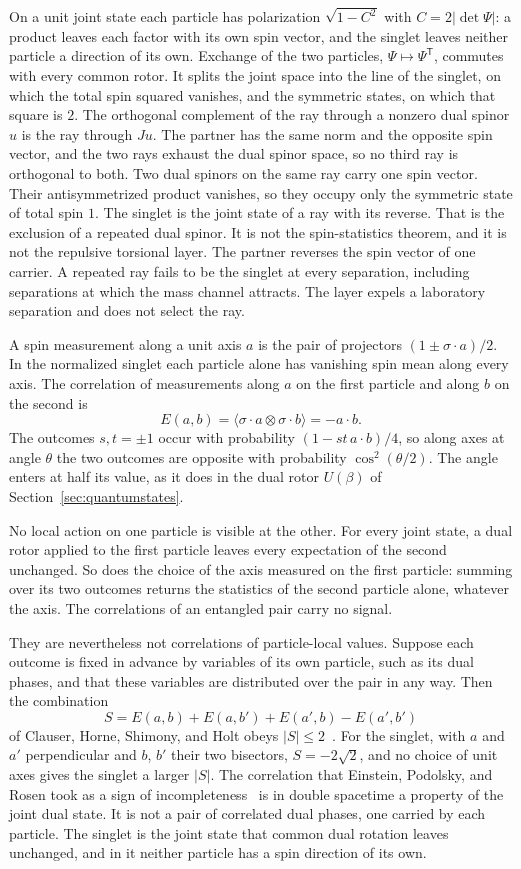 \documentclass[a4paper]{article}
\begin{document}
On a unit joint state each particle has polarization $\sqrt{1-C^2}$ with $C=2|\det\Psi|$: a product leaves each factor with its own spin vector, and the singlet leaves neither particle a direction of its own. Exchange of the two particles, $\Psi\mapsto\Psi^{\mathsf T}$, commutes with every common rotor. It splits the joint space into the line of the singlet, on which the total spin squared vanishes, and the symmetric states, on which that square is $2$. The orthogonal complement of the ray through a nonzero dual spinor $u$ is the ray through $Ju$. The partner has the same norm and the opposite spin vector, and the two rays exhaust the dual spinor space, so no third ray is orthogonal to both. Two dual spinors on the same ray carry one spin vector. Their antisymmetrized product vanishes, so they occupy only the symmetric state of total spin $1$. The singlet is the joint state of a ray with its reverse. That is the exclusion of a repeated dual spinor. It is not the spin-statistics theorem, and it is not the repulsive torsional layer. The partner reverses the spin vector of one carrier. A repeated ray fails to be the singlet at every separation, including separations at which the mass channel attracts. The layer expels a laboratory separation and does not select the ray.

A spin measurement along a unit axis $a$ is the pair of projectors $(1\pm\sigma\cdot a)/2$. In the normalized singlet each particle alone has vanishing spin mean along every axis. The correlation of measurements along $a$ on the first particle and along $b$ on the second is
\[
E(a,b)=\langle\sigma\cdot a\otimes\sigma\cdot b\rangle=-a\cdot b .
\]
The outcomes $s,t=\pm1$ occur with probability $(1-st\,a\cdot b)/4$, so along axes at angle $\theta$ the two outcomes are opposite with probability $\cos^2(\theta/2)$. The angle enters at half its value, as it does in the dual rotor $U(\beta)$ of Section~\ref{sec:quantumstates}.

No local action on one particle is visible at the other. For every joint state, a dual rotor applied to the first particle leaves every expectation of the second unchanged. So does the choice of the axis measured on the first particle: summing over its two outcomes returns the statistics of the second particle alone, whatever the axis. The correlations of an entangled pair carry no signal.

They are nevertheless not correlations of particle-local values. Suppose each outcome is fixed in advance by variables of its own particle, such as its dual phases, and that these variables are distributed over the pair in any way. Then the combination
\[
S=E(a,b)+E(a,b')+E(a',b)-E(a',b')
\]
of Clauser, Horne, Shimony, and Holt obeys $|S|\le 2$~\cite{bell1964,chsh1969}. For the singlet, with $a$ and $a'$ perpendicular and $b$, $b'$ their two bisectors, $S=-2\sqrt2$, and no choice of unit axes gives the singlet a larger $|S|$. The correlation that Einstein, Podolsky, and Rosen took as a sign of incompleteness~\cite{epr1935} is in double spacetime a property of the joint dual state. It is not a pair of correlated dual phases, one carried by each particle. The singlet is the joint state that common dual rotation leaves unchanged, and in it neither particle has a spin direction of its own.
\end{document}
